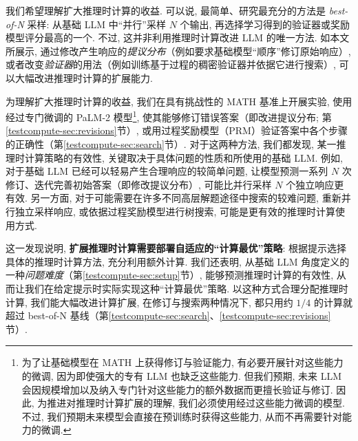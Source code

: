 我们希望理解扩大推理时计算的收益. 可以说, 最简单、研究最充分的方法是 \emph{best-of-N} 采样: 从基础 LLM 中“并行”采样 $N$ 个输出, 再选择学习得到的验证器或奖励模型评分最高的一个\cite{testcompute-cobbe2021training,testcompute-lightman2023lets}. 不过, 这并非利用推理时计算改进 LLM 的唯一方法. 如本文所展示, 通过修改产生响应的\emph{提议分布}（例如要求基础模型“顺序”修订原始响应\cite{testcompute-qu2024recursive}）, 或者改变\emph{验证器}的用法（例如训练基于过程的稠密验证器\cite{testcompute-lightman2023lets,testcompute-wang2023mathshepherd}并依据它进行搜索）, 可以大幅改进推理时计算的扩展能力. 

为理解扩大推理时计算的收益, 我们在具有挑战性的 MATH 基准\cite{testcompute-hendrycks2021measuring}上开展实验, 使用经过专门微调的 PaLM-2 模型\cite{testcompute-anil2023palm}\footnote{为了让基础模型在 MATH 上获得修订与验证能力, 有必要开展针对这些能力的微调, 因为即使强大的专有 LLM 也缺乏这些能力\cite{testcompute-huang2023large,testcompute-sharma2024criticalevaluationaifeedback}. 但我们预期, 未来 LLM 会因规模增加以及纳入专门针对这些能力的额外数据而更擅长验证与修订\cite{testcompute-predictemergence,testcompute-blakeney2024doesdatasparkjoy,testcompute-llmcriticscatchbugs}. 因此, 为推进对推理时计算扩展的理解, 我们必须使用经过这些能力微调的模型. 不过, 我们预期未来模型会直接在预训练时获得这些能力, 从而不再需要针对能力的微调. }, 使其能够修订错误答案\cite{testcompute-qu2024recursive}（即改进提议分布; 第\ref{testcompute-sec:revisions}节）, 或用过程奖励模型（PRM）验证答案中各个步骤的正确性\cite{testcompute-lightman2023lets,testcompute-wang2023mathshepherd}（第\ref{testcompute-sec:search}节）. 对于这两种方法, 我们都发现, 某一推理时计算策略的有效性, 关键取决于具体问题的性质和所使用的基础 LLM. 例如, 对于基础 LLM 已经可以轻易产生合理响应的较简单问题, 让模型预测一系列 $N$ 次修订、迭代完善初始答案（即修改提议分布）, 可能比并行采样 $N$ 个独立响应更有效. 另一方面, 对于可能需要在许多不同高层解题途径中搜索的较难问题, 重新并行独立采样响应, 或依据过程奖励模型进行树搜索, 可能是更有效的推理时计算使用方式. 

这一发现说明, \textbf{扩展推理时计算需要部署自适应的“计算最优”策略}: 根据提示选择具体的推理时计算方法, 充分利用额外计算. 我们还表明, 从基础 LLM 角度定义的一种\emph{问题难度}（第\ref{testcompute-sec:setup}节）, 能够预测推理时计算的有效性, 从而让我们在给定提示时实际实现这种“计算最优”策略. 以这种方式合理分配推理时计算, 我们能大幅改进计算扩展, 在修订与搜索两种情况下, 都只用约 $1/4$ 的计算就超过 best-of-N 基线（第\ref{testcompute-sec:search}、\ref{testcompute-sec:revisions}节）. 

